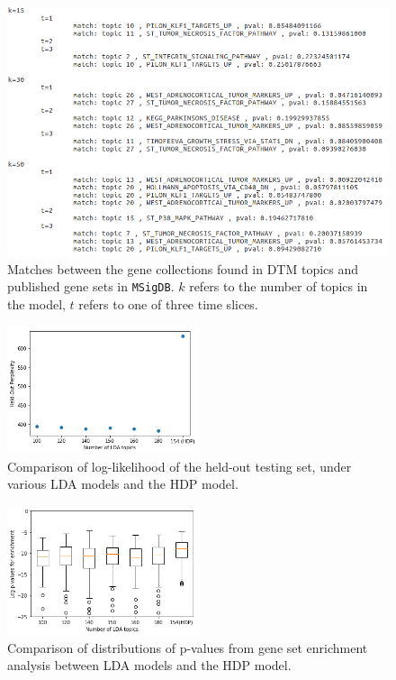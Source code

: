 \documentclass{article}
\begin{document}
\begin{figure}
    \centering
    \includegraphics[width=1\textwidth]{figs/pathwaysdtm}
    \caption{Matches between the gene collections found in DTM topics and published gene sets in \texttt{MSigDB}. $k$ refers to the number of topics in the model, $t$ refers to one of three time slices.}
    \label{fig:pathwaysdtm}
\end{figure}

\begin{figure}
    \centering
    \includegraphics[width=0.5\textwidth]{figs/hdp-perplexity}
    \caption{Comparison of log-likelihood of the held-out testing set, under various LDA models and the HDP model.}
    \label{fig:hdp-perplexity}
\end{figure}

\begin{figure}
    \centering
    \includegraphics[width=0.5\textwidth]{figs/hdp-enrichment}
    \caption{Comparison of distributions of p-values from gene set enrichment analysis between LDA models and the HDP model.}
    \label{fig:hdp-enrichment}
\end{figure}
\end{document}
